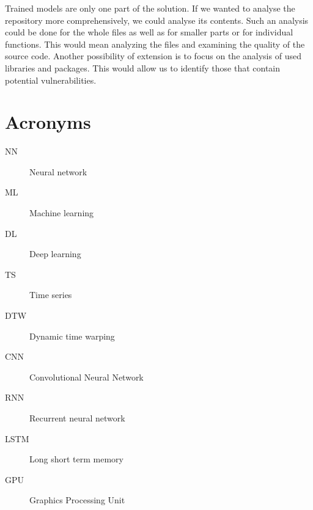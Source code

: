 \documentclass[thesis=M,english]{FITthesis}[2019/12/23]
\begin{document}
Trained models are only one part of the solution. If we wanted to analyse the repository more comprehensively, we could analyse its contents. Such an analysis could be done for the whole files as well as for smaller parts or for individual functions. This would mean analyzing the files and examining the quality of the source code. Another possibility of extension is to focus on the analysis of used libraries and packages. This would allow us to identify those that contain potential vulnerabilities.

\printbibliography

\appendix

\chapter{Acronyms}

\begin{description}
	\item[NN] Neural network
	\item[ML] Machine learning
	\item[DL] Deep learning
	\item[TS] Time series
	\item[DTW] Dynamic time warping
	\item[CNN] Convolutional Neural Network
	\item[RNN] Recurrent neural network
	\item[LSTM] Long short term memory
	\item[GPU] Graphics Processing Unit
\end{description}

\begin{figure}
\end{figure}
\end{document}
